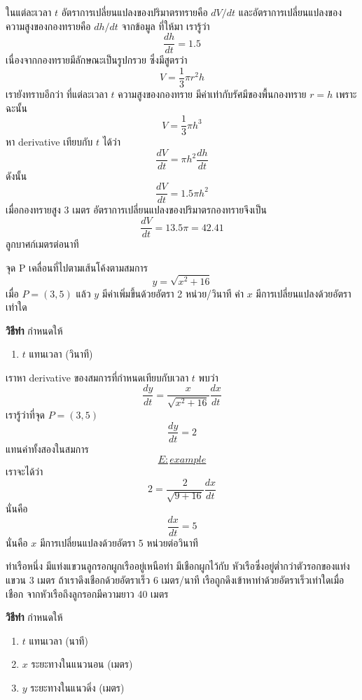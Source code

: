 \documentclass[
]{book}
\providecommand{\tightlist}{%
  \setlength{\itemsep}{0pt}\setlength{\parskip}{0pt}}
\begin{document}
ในแต่ละเวลา \(t\) อัตราการเปลี่ยนแปลงของปริมาตรทรายคือ \(dV/dt\)
และอัตราการเปลี่ยนแปลงของความสูงของกองทรายคือ \(dh/dt\) จากข้อมูล ที่ให้มา เรารู้ว่า
\[\frac{dh}{dt} = 1.5\] เนื่องจากกองทรายมีลักษณะเป็นรูปกรวย ซึ่งมีสูตรว่า
\[V = \frac{1}{3}\pi r^2h\] เรายังทราบอีกว่า ที่แต่ละเวลา \(t\)
ความสูงของกองทราย มีค่าเท่ากับรัศมีของพื้นกองทราย \(r=h\) เพราะฉะนั้น
\[V = \frac{1}{3}\pi h^3\] หา derivative เทียบกับ \(t\) ได้ว่า
\[\frac{dV}{dt} = \pi h^2\frac{dh}{dt}\] ดังนั้น
\[\frac{dV}{dt} = 1.5\pi h^2\] เมื่อกองทรายสูง 3 เมตร
อัตราการเปลี่ยนแปลงของปริมาตรกองทรายจึงเป็น
\[\frac{dV}{dt} = 13.5\pi = 42.41\] ลูกบาศก์เมตรต่อนาที

จุด P เคลื่อนที่ไปตามเส้นโค้งตามสมการ \[y = \sqrt{x^2+16}\] เมื่อ \(P = (3,5)\)
แล้ว \(y\) มีค่าเพิ่มขึ้นด้วยอัตรา 2 หน่วย/วินาที ค่า \(x\) มีการเปลี่ยนแปลงด้วยอัตราเท่าใด

\textbf{วิธีทำ} กำหนดให้

\begin{enumerate}
\def\labelenumi{\arabic{enumi}.}
\tightlist
\item
  \(t\) แทนเวลา (วินาที)
\end{enumerate}

เราหา derivative ของสมการที่กำหนดเทียบกับเวลา \(t\) พบว่า \[\label{E:example}
    \frac{dy}{dt} = \frac{x}{\sqrt{x^2+16}}\frac{dx}{dt}\] เรารู้ว่าที่จุด
\(P = (3,5)\) \[\frac{dy}{dt} = 2\]
แทนค่าทั้งสองในสมการ~\hyperref[E:example]{\[E:example\]} เราจะได้ว่า
\[2 = \frac{2}{\sqrt{9+16}}\frac{dx}{dt}\] นั่นคือ \[\frac{dx}{dt} = 5\]
นั่นคือ \(x\) มีการเปลี่ยนแปลงด้วยอัตรา 5 หน่วยต่อวินาที

ท่าเรือหนึ่ง มีแท่งแขวนลูกรอกผูกเรืออยู่เหนือท่า มีเชือกผูกไว้กับ
หัวเรือซึ่งอยู่ต่ำกว่าตัวรอกของแท่งแขวน 3 เมตร ถ้าเราดึงเชือกด้วยอัตราเร็ว 6 เมตร/นาที
เรือถูกดึงเข้าหาท่าด้วยอัตราเร็วเท่าใดเมื่อเชือก จากหัวเรือถึงลูกรอกมีความยาว 40 เมตร

\textbf{วิธีทำ} กำหนดให้

\begin{enumerate}
\def\labelenumi{\arabic{enumi}.}
\item
  \(t\) แทนเวลา (นาที)
\item
  \(x\) ระยะทางในแนวนอน (เมตร)
\item
  \(y\) ระยะทางในแนวดิ่ง (เมตร)
\end{enumerate}
\end{document}
